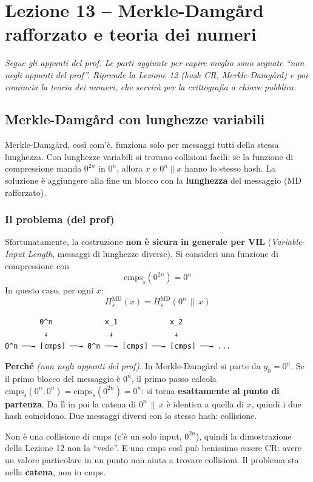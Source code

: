 \chapter{Lezione 13 -- Merkle-Damgård rafforzato e teoria dei numeri}

\emph{Segue gli appunti del prof. Le parti aggiunte per capire meglio sono segnate ``non negli appunti del prof''. Riprende la Lezione 12 (hash CR, Merkle-Damgård) e poi comincia la teoria dei numeri, che servirà per la crittografia a chiave pubblica.}

\section{Merkle-Damgård con lunghezze variabili}

\begin{inbreve}
Merkle-Damgård, così com'è, funziona solo per messaggi tutti della stessa lunghezza. Con lunghezze variabili si trovano collisioni facili: se la funzione di compressione manda \(0^{2n}\) in \(0^n\), allora \(x\) e \(0^n \| x\) hanno lo stesso hash. La soluzione è aggiungere alla fine un blocco con la \textbf{lunghezza} del messaggio (MD rafforzato).
\end{inbreve}

\subsection{Il problema (del prof)}

Sfortunatamente, la costruzione \textbf{non è sicura in generale per VIL} (\emph{Variable-Input Length}, messaggi di lunghezze diverse). Si consideri una funzione di compressione con
\[
\text{cmps}_s(0^{2n}) = 0^n
\]
In questo caso, per ogni \(x\):
\[
H_s^{\text{MD}}(x) = H_s^{\text{MD}}(0^n \,\|\, x)
\]

\begin{verbatim}
        0^n            x_1            x_2
         ↓              ↓              ↓
0^n ──→ [cmps] ──→ 0^n ──→ [cmps] ──→ [cmps] ──→ ...
\end{verbatim}

\begin{nota}
\textbf{Perché} \emph{(non negli appunti del prof)}. In Merkle-Damgård si parte da \(y_0 = 0^n\). Se il primo blocco del messaggio è \(0^n\), il primo passo calcola \(\text{cmps}_s(0^n, 0^n) = \text{cmps}_s(0^{2n}) = 0^n\): si torna \textbf{esattamente al punto di partenza}. Da lì in poi la catena di \(0^n \,\|\, x\) è identica a quella di \(x\), quindi i due hash coincidono. Due messaggi diversi con lo stesso hash: collisione.

Non è una collisione di cmps (c'è un solo input, \(0^{2n}\)), quindi la dimostrazione della Lezione 12 non la ``vede''. E una cmps così può benissimo essere CR: avere un valore particolare in un punto non aiuta a trovare collisioni. Il problema sta nella \textbf{catena}, non in cmps.
\end{nota}

